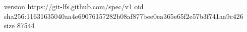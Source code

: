 version https://git-lfs.github.com/spec/v1
oid sha256:11631635040aa4e69076157282b08af877bee0ea365e65f2e57b3f741aa9c426
size 87544
